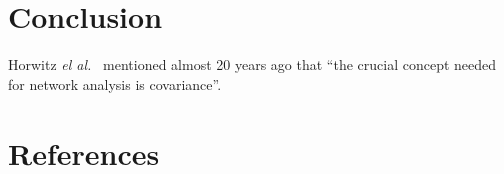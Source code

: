 \documentclass[5p]{elsarticle}
\begin{document}

\section{Conclusion}

Horwitz \emph{el al.}\ \cite{horwitz1995} mentioned almost 20 years ago
that ``the crucial concept needed for network analysis is covariance''.


{
\section*{References} \small 
 }

\end{document}
